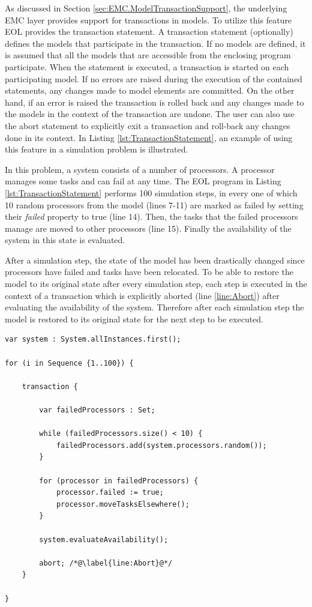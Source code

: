 As discussed in Section \ref{sec:EMC.ModelTransactionSupport}, the underlying EMC layer provides support for transactions in models. To utilize this feature EOL provides the transaction statement. A transaction statement (optionally) defines the models that participate in the transaction. If no models are defined, it is assumed that all the models that are accessible from the enclosing program participate. When the statement is executed, a transaction is started on each participating model. If no errors are raised during the execution of the contained statements, any changes made to model elements are committed. On the other hand, if an error is raised the transaction is rolled back and any changes made to the models in the context of the transaction are undone. The user can also use the abort statement to explicitly exit a transaction and roll-back any changes done in its context. In Listing \ref{lst:TransactionStatement}, an example of using this feature in a simulation problem is illustrated.

In this problem, a system consists of a number of processors. A processor manages some tasks and can fail at any time. The EOL program in Listing \ref{lst:TransactionStatement} performs 100 simulation steps, in every one of which 10 random processors from the model (lines 7-11) are marked as failed by setting their \emph{failed} property to true (line 14). Then, the tasks that the failed processors manage are moved to other processors (line 15). Finally the availability of the system in this state is evaluated.

After a simulation step, the state of the model has been drastically changed since processors have failed and tasks have been relocated. To be able to restore the model to its original state after every simulation step, each step is executed in the context of a transaction which is explicitly aborted (line \ref{line:Abort}) after evaluating the availability of the system. Therefore after each simulation step the model is restored to its original state for the next step to be executed.

\begin{lstlisting}[basicstyle=\ttfamily\footnotesize, flexiblecolumns=true, numbers=none, nolol=true, caption=Example of a for statement, label=lst:TransactionStatement, numbers=left, language=EOL, tabsize=2]
var system : System.allInstances.first();

for (i in Sequence {1..100}) {

	transaction {
		
		var failedProcessors : Set; 
		
		while (failedProcessors.size() < 10) {
			failedProcessors.add(system.processors.random());
		}
		
		for (processor in failedProcessors) {
			processor.failed := true;
			processor.moveTasksElsewhere();
		}
		
		system.evaluateAvailability();
		
		abort; /*@\label{line:Abort}@*/
	}
	
}
\end{lstlisting}

